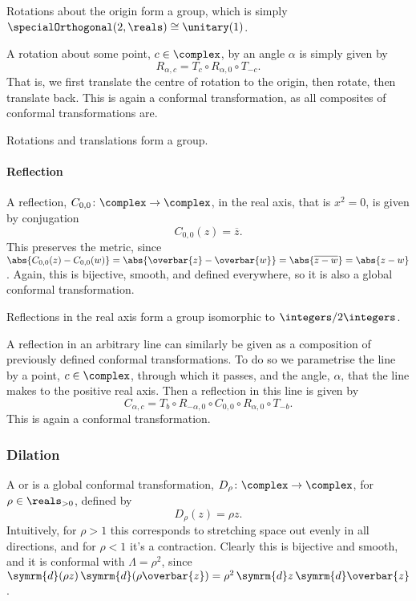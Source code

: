 \documentclass[fleqn]{NotesClass}
\renewcommand{\dd}[1]{\,\symrm{d}#1}
\renewcommand{\dl}[1]{\symrm{d}#1}
\newcommand{\isomorphic}{\cong}
\begin{document}
    Rotations about the origin form a group, which is simply \(\specialOrthogonal(2, \reals) \isomorphic \unitary(1)\).
    
    A rotation about some point, \(c \in \complex\), by an angle \(\alpha\) is simply given by
    \begin{equation}
        R_{\alpha, c} = T_c \circ R_{\alpha, 0} \circ T_{-c}.
    \end{equation}
    That is, we first translate the centre of rotation to the origin, then rotate, then translate back.
    This is again a conformal transformation, as all composites of conformal transformations are.
    
    Rotations and translations form a group.
    
    \paragraph{Reflection}
    A reflection, \(C_{0, 0} \colon \complex \to \complex\), in the real axis, that is \(x^2 = 0\), is given by conjugation
    \begin{equation}
        C_{0, 0}(z) = \overbar{z}.
    \end{equation}
    This preserves the metric, since \(\abs{C_{0, 0}(z) - C_{0, 0}(w)} = \abs{\overbar{z} - \overbar{w}} = \abs{\overline{z - w}} = \abs{z - w}\).
    Again, this is bijective, smooth, and defined everywhere, so it is also a global conformal transformation.
    
    Reflections in the real axis form a group isomorphic to \(\integers/2\integers\).
    
    A reflection in an arbitrary line can similarly be given as a composition of previously defined conformal transformations.
    To do so we parametrise the line by a point, \(c \in \complex\), through which it passes, and the angle, \(\alpha\), that the line makes to the positive real axis.
    Then a reflection in this line is given by
    \begin{equation}
        C_{\alpha, c} = T_b \circ R_{-\alpha, 0} \circ C_{0, 0} \circ R_{\alpha, 0} \circ T_{-b}.
    \end{equation}
    This is again a conformal transformation.
    
    \subsubsection{Dilation}
    A  or  is a global conformal transformation, \(D_\rho \colon \complex \to \complex\), for \(\rho \in \reals_{>0}\), defined by
    \begin{equation}
        D_\rho(z) = \rho z.
    \end{equation}
    Intuitively, for \(\rho > 1\) this corresponds to stretching space out evenly in all directions, and for \(\rho < 1\) it's a contraction.
    Clearly this is bijective and smooth, and it is conformal with \(\Lambda = \rho^2\), since \(\dl{(\rho z)} \dd{(\rho \overbar{z})} = \rho^2 \dd{z}\dd{\overbar{z}}\).
    
\end{document}
